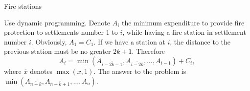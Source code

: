 \begin{tutorial}{Fire stations}

Use dynamic programming. Denote $A_i$ the minimum expenditure to provide fire protection to settlements number 1 to $i$, while having a fire station in settlement number $i$. Obviously, $A_1=C_1$. If we have a station at $i$, the distance to the previous station must be no greater $2k+1$. Therefore $$A_i = \min(A_{\overline{i-2k-1}}, A_{\overline{i-2k}}, \dots, A_{i-1}) + C_i,$$ where $\overline{x}$ denotes $\max(x,1)$. The answer to the problem is $\min(A_{\overline{n-k}}, A_{\overline{n-k+1}}, \dots, A_n)$.

\end{tutorial}
